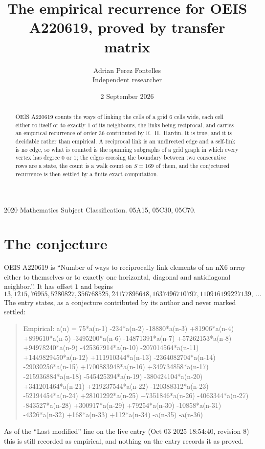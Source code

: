 \documentclass[11pt,a4paper]{article}
\title{The empirical recurrence for OEIS A220619, proved by transfer matrix}
\author{Adrian Perez Fontelles\\ \small Independent researcher}
\date{2 September 2026}
\theoremstyle{plain}
\theoremstyle{definition}
\begin{document}
\maketitle

\begin{abstract}
OEIS A220619 counts the ways of linking the cells of a grid $6$ cells wide, each cell either to
itself or to exactly $1$ of its neighbours, the links being reciprocal, and carries an
empirical recurrence of order $36$ contributed by R.~H.~Hardin. It is true, and it is
decidable rather than empirical. A reciprocal link is an undirected edge and a self-link is
no edge, so what is counted is the spanning subgraphs of a grid graph in which every vertex
has degree $0$ or $1$; the edges crossing the boundary between two consecutive rows are a
state, the count is a walk count on $S=169$ of them, and the conjectured recurrence is then
settled by a finite exact computation.
\end{abstract}

\noindent\small 2020 Mathematics Subject Classification. 05A15, 05C30, 05C70.\normalsize

\section{The conjecture}

OEIS A220619 is ``Number of ways to reciprocally link elements of an nX6 array either to themselves or to exactly one horizontal, diagonal and antidiagonal neighbor.''. It has offset $1$ and begins
\[
13, 1215, 76955, 5280827, 356768525, 24177895648, 1637496710797, 110916199227139,\ \dots
\]
The entry states, as a conjecture contributed by its author and never marked settled:
\begin{quote}
Empirical: a(n) = 75*a(n-1) -234*a(n-2) -18880*a(n-3) +81906*a(n-4) +899610*a(n-5) -3495200*a(n-6) -14871391*a(n-7) +57262153*a(n-8) +94978240*a(n-9) -425367914*a(n-10) -207014564*a(n-11) +1449829450*a(n-12) +111910344*a(n-13) -2364082704*a(n-14) -29030256*a(n-15) +1700883948*a(n-16) +349734858*a(n-17) -215936884*a(n-18) -545425394*a(n-19) -380424104*a(n-20) +341201464*a(n-21) +219237544*a(n-22) -120388312*a(n-23) -52194454*a(n-24) +28101292*a(n-25) +7351846*a(n-26) -4063344*a(n-27) -843527*a(n-28) +300917*a(n-29) +79254*a(n-30) -10858*a(n-31) -4326*a(n-32) +168*a(n-33) +112*a(n-34) -a(n-35) -a(n-36)
\end{quote}
As of the ``Last modified'' line on the live entry (Oct 03 2025 18:54:40, revision 8) this is still
recorded as empirical, and nothing on the entry records it as proved.
\end{document}

